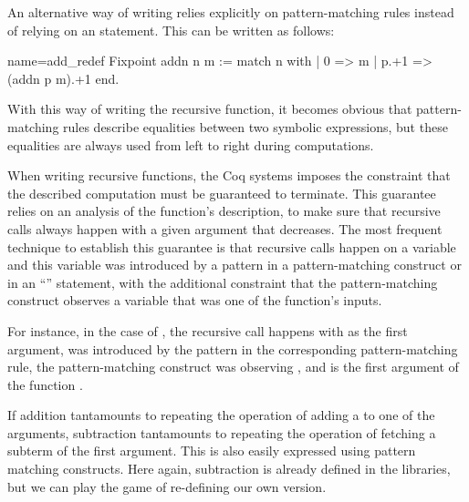 An alternative way of writing  relies explicitly on
pattern-matching rules instead of relying on an  statement.
This can be written as follows:

\begin{coq}{name=add_redef}{}
Fixpoint addn n m :=
  match n with
  | 0 => m
  | p.+1 => (addn p m).+1
  end.
\end{coq}
With this way of writing the recursive function, it becomes obvious that
pattern-matching rules describe equalities between two symbolic
expressions, but these equalities are always used from left to right during
computations.

When writing recursive functions, the Coq systems imposes the
constraint that the described computation must be guaranteed to
terminate.  This guarantee relies on an analysis of the function's
description, to make sure that recursive calls always happen with a
given argument that decreases.  The most frequent technique to
establish this guarantee is that recursive calls happen on a variable
and this variable was introduced by a pattern in a pattern-matching
construct or in an ``'' statement, with the additional
constraint that the pattern-matching construct observes a variable
that was one of the function's inputs.

For instance, in the case of , the recursive call happens
with  as the first argument,  was introduced by the pattern 
in the corresponding pattern-matching rule, the pattern-matching
construct was observing , and  is the first argument of the
function .

% 
% 
If addition tantamounts to repeating the operation of adding a 
to one of the arguments, subtraction tantamounts to repeating the
operation of fetching a subterm of the first argument.  This is also
easily expressed using pattern matching constructs.  Here again,
subtraction is already defined in the libraries, but we can play the game
of re-defining our own version.

